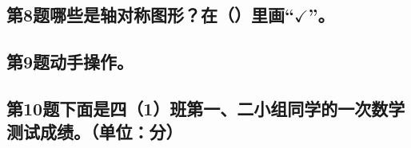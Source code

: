 \subsection*{第8题\quad 哪些是轴对称图形？在（\hspace{25pt}）里画“$\checkmark$”。}
\subsection*{第9题\quad 动手操作。}
\subsection*{第10题\quad 下面是四（1）班第一、二小组同学的一次数学测试成绩。（单位：分）}
